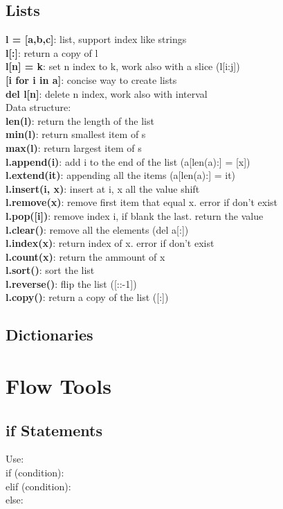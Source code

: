 \documentclass{cheatsheet}
\begin{document}
    \subsection{Lists}
    \textbf{l = [a,b,c]}: list, support index like strings \\
    \textbf{l[:]}: return a copy of l \\
    \textbf{l[n] = k}: set n index to k, work also with a slice (l[i:j]) \\
    \textbf{[i for i in a]}: concise way to create lists \\
    \textbf{del l[n]}: delete n index, work also with interval \\
    Data structure: \\
    \textbf{len(l)}: return the length of the list \\
    \textbf{min(l)}: return smallest item of s \\
    \textbf{max(l)}: return largest item of s \\
    \textbf{l.append(i)}: add i to the end of the list (a[len(a):] = [x]) \\
    \textbf{l.extend(it)}: appending all the items (a[len(a):] = it) \\
    \textbf{l.insert(i, x)}: insert at i, x all the value shift \\
    \textbf{l.remove(x)}: remove first item that equal x. error if don't exist\\
    \textbf{l.pop([i])}: remove index i, if blank the last. return the value \\
    \textbf{l.clear()}: remove all the elements (del a[:])\\
    \textbf{l.index(x)}: return index of x. error if don't exist \\
    \textbf{l.count(x)}: return the ammount of x \\
    \textbf{l.sort()}: sort the list \\
    \textbf{l.reverse()}: flip the list ([::-1]) \\
    \textbf{l.copy()}: return a copy of the list ([:])
    \subsection{Dictionaries}
    
\section{Flow Tools}


    \subsection{if Statements}
    Use: \\
    if (condition): \\
    elif (condition): \\
    else: 
\end{document}
